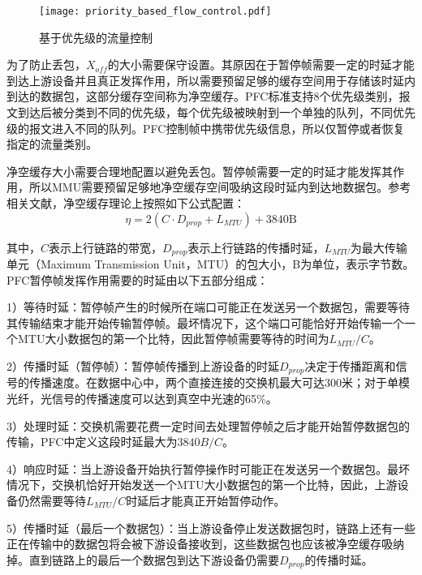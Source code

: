 \begin{figure}[H]
  \centering
  \texttt{[image: priority\_based\_flow\_control.pdf]}
  \caption{基于优先级的流量控制}
  \label{fig:c2:priority-based flow control}
\end{figure}

为了防止丢包，$X_{off}$的大小需要保守设置。其原因在于暂停帧需要一定的时延才能到达上游设备并且真正发挥作用，所以需要预留足够的缓存空间用于存储该时延内到达的数据包，这部分缓存空间称为净空缓存。PFC标准支持8个优先级类别\cite{PFC}，报文到达后被分类到不同的优先级，每个优先级被映射到一个单独的队列，不同优先级的报文进入不同的队列。PFC控制帧中携带优先级信息，所以仅暂停或者恢复指定的流量类别。

净空缓存大小需要合理地配置以避免丢包。暂停帧需要一定的时延才能发挥其作用，所以MMU需要预留足够地净空缓存空间吸纳这段时延内到达地数据包。参考相关文献\cite{SIGCOMM15DCQCN,SIGCOMM16RDMA,CiscoNexus7000PFC,PFCProposal}，净空缓存理论上按照如下公式配置：
\begin{equation}
    \eta = 2(C \cdot D_{prop} + L_{MTU}) + \text{3840B}
    \label{eqn:c2:headroom calculation}
\end{equation}

其中，$C$表示上行链路的带宽，$D_{prop}$表示上行链路的传播时延，$L_{MTU}$为最大传输单元（Maximum Transmission Unit，MTU）的包大小，B为单位，表示字节数。PFC暂停帧发挥作用需要的时延由以下五部分组成：

1）等待时延：暂停帧产生的时候所在端口可能正在发送另一个数据包，需要等待其传输结束才能开始传输暂停帧。最坏情况下，这个端口可能恰好开始传输一个一个MTU大小数据包的第一个比特，因此暂停帧需要等待的时间为$L_{MTU} / C$。

2）传播时延（暂停帧）：暂停帧传播到上游设备的时延$D_{prop}$决定于传播距离和信号的传播速度。在数据中心中，两个直接连接的交换机最大可达300米\cite{SIGCOMM16RDMA}；对于单模光纤，光信号的传播速度可以达到真空中光速的65\%。

3）处理时延：交换机需要花费一定时间去处理暂停帧之后才能开始暂停数据包的传输，PFC中定义这段时延最大为$3840B/C$\cite{CiscoNexus7000PFC}。

4）响应时延：当上游设备开始执行暂停操作时可能正在发送另一个数据包。最坏情况下，交换机恰好开始发送一个MTU大小数据包的第一个比特，因此，上游设备仍然需要等待$L_{MTU} / C$时延后才能真正开始暂停动作。

5）传播时延（最后一个数据包）：当上游设备停止发送数据包时，链路上还有一些正在传输中的数据包将会被下游设备接收到，这些数据包也应该被净空缓存吸纳掉。直到链路上的最后一个数据包到达下游设备仍需要$D_{prop}$的传播时延。 


